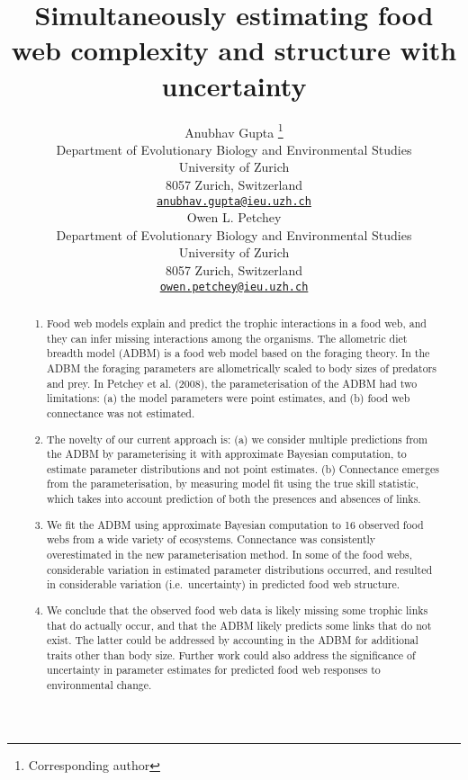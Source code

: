 \documentclass{article}
\title{Simultaneously estimating food web complexity and structure with
uncertainty}
\author{
    Anubhav Gupta
    \thanks{Corresponding author}
   \\
    Department of Evolutionary Biology and Environmental Studies \\
    University of Zurich \\
  8057 Zurich, Switzerland \\
  \texttt{\href{mailto:anubhav.gupta@ieu.uzh.ch}{\nolinkurl{anubhav.gupta@ieu.uzh.ch}}} \\
   \And
    Owen L. Petchey
   \\
    Department of Evolutionary Biology and Environmental Studies \\
    University of Zurich \\
  8057 Zurich, Switzerland \\
  \texttt{\href{mailto:owen.petchey@ieu.uzh.ch}{\nolinkurl{owen.petchey@ieu.uzh.ch}}} \\
  }
\begin{document}
\maketitle

\def\tightlist{}


\begin{abstract}
\begin{enumerate}
\def\labelenumi{\arabic{enumi})}
\tightlist
\item
  Food web models explain and predict the trophic interactions in a food
  web, and they can infer missing interactions among the organisms. The
  allometric diet breadth model (ADBM) is a food web model based on the
  foraging theory. In the ADBM the foraging parameters are
  allometrically scaled to body sizes of predators and prey. In Petchey
  et al. (2008), the parameterisation of the ADBM had two limitations:
  (a) the model parameters were point estimates, and (b) food web
  connectance was not estimated.
\item
  The novelty of our current approach is: (a) we consider multiple
  predictions from the ADBM by parameterising it with approximate
  Bayesian computation, to estimate parameter distributions and not
  point estimates. (b) Connectance emerges from the parameterisation, by
  measuring model fit using the true skill statistic, which takes into
  account prediction of both the presences and absences of links.
\item
  We fit the ADBM using approximate Bayesian computation to 16 observed
  food webs from a wide variety of ecosystems. Connectance was
  consistently overestimated in the new parameterisation method. In some
  of the food webs, considerable variation in estimated parameter
  distributions occurred, and resulted in considerable variation
  (i.e.~uncertainty) in predicted food web structure.
\item
  We conclude that the observed food web data is likely missing some
  trophic links that do actually occur, and that the ADBM likely
  predicts some links that do not exist. The latter could be addressed
  by accounting in the ADBM for additional traits other than body size.
  Further work could also address the significance of uncertainty in
  parameter estimates for predicted food web responses to environmental
  change.
\end{enumerate}
\end{abstract}

\end{document}

